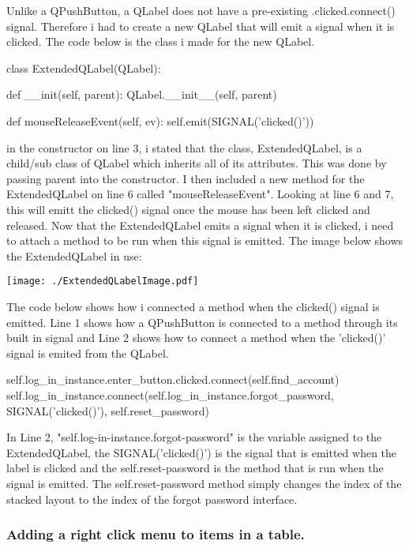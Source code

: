 Unlike a QPushButton, a QLabel does not have a pre-existing .clicked.connect() signal. Therefore i had to create a new QLabel that will emit a signal when it is clicked. The code below is the class i made for the new QLabel.

\begin{python}
class ExtendedQLabel(QLabel):
 
    def __init(self, parent):
        QLabel.__init__(self, parent)
 
    def mouseReleaseEvent(self, ev):
        self.emit(SIGNAL('clicked()'))
\end{python}

in the constructor on line 3, i stated that the class, ExtendedQLabel, is a child/sub class of QLabel which inherits all of its attributes. This was done by passing parent into the constructor. I then included a new method for the ExtendedQLabel on line 6 called "mouseReleaseEvent". Looking at line 6 and 7, this will emitt the clicked() signal once the mouse has been left clicked and released. Now that the ExtendedQLabel emits a signal when it is clicked, i need to attach a method to be run when this signal is emitted. The image below shows the ExtendedQLabel in use:

\texttt{[image: ./ExtendedQLabelImage.pdf]}

The code below shows how i connected a method when the clicked() signal is emitted. Line 1 shows how a QPushButton is connected to a method through its built in signal and Line 2 shows how to connect a method when the 'clicked()' signal is emited from the QLabel.

\begin{python}
self.log_in_instance.enter_button.clicked.connect(self.find_account)
self.log_in_instance.connect(self.log_in_instance.forgot_password, SIGNAL('clicked()'), self.reset_password)
\end{python}

In Line 2, "self.log-in-instance.forgot-password" is the variable assigned to the ExtendedQLabel, the SIGNAL('clicked()') is the signal that is emitted when the label is clicked and the self.reset-password is the method that is run when the signal is emitted. The self.reset-password method simply changes the index of the stacked layout to the index of the forgot password interface.

\subsubsection{Adding a right click menu to items in a table.}


